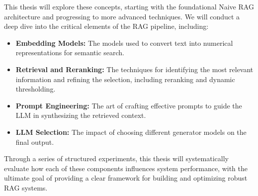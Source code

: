 This thesis will explore these concepts, starting with the foundational Naive RAG architecture and progressing to more advanced techniques. We will conduct a deep dive into the critical elements of the RAG pipeline, including:
\begin{itemize}
    \item \textbf{Embedding Models:} The models used to convert text into numerical representations for semantic search.
    \item \textbf{Retrieval and Reranking:} The techniques for identifying the most relevant information and refining the selection, including reranking and dynamic thresholding.
    \item \textbf{Prompt Engineering:} The art of crafting effective prompts to guide the LLM in synthesizing the retrieved context.
    \item \textbf{LLM Selection:} The impact of choosing different generator models on the final output.
\end{itemize}

Through a series of structured experiments, this thesis will systematically evaluate how each of these components influences system performance, with the ultimate goal of providing a clear framework for building and optimizing robust RAG systems.